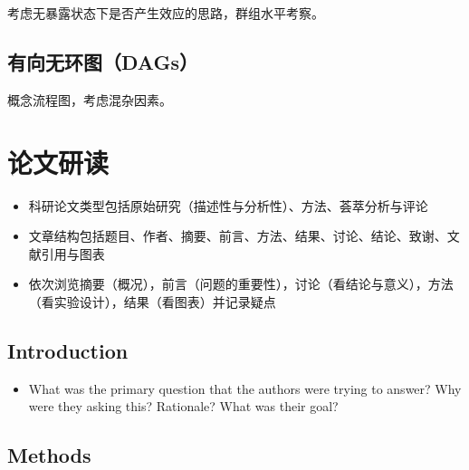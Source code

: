 \documentclass[]{book}
\providecommand{\tightlist}{%
  \setlength{\itemsep}{0pt}\setlength{\parskip}{0pt}}
\begin{document}
考虑无暴露状态下是否产生效应的思路，群组水平考察。

\hypertarget{dags}{%
\subsection{有向无环图（DAGs）}\label{dags}}

概念流程图，考虑混杂因素。

\section{论文研读}

\begin{itemize}
\tightlist
\item
  科研论文类型包括原始研究（描述性与分析性）、方法、荟萃分析与评论
\item
  文章结构包括题目、作者、摘要、前言、方法、结果、讨论、结论、致谢、文献引用与图表
\item
  依次浏览摘要（概况），前言（问题的重要性），讨论（看结论与意义），方法（看实验设计），结果（看图表）并记录疑点
\end{itemize}

\hypertarget{introduction}{%
\subsection{Introduction}\label{introduction}}

\begin{itemize}
\tightlist
\item
  What was the primary question that the authors were trying to answer? Why were they asking this? Rationale? What was their goal?
\end{itemize}

\hypertarget{methods}{%
\subsection{Methods}\label{methods}}
\end{document}

